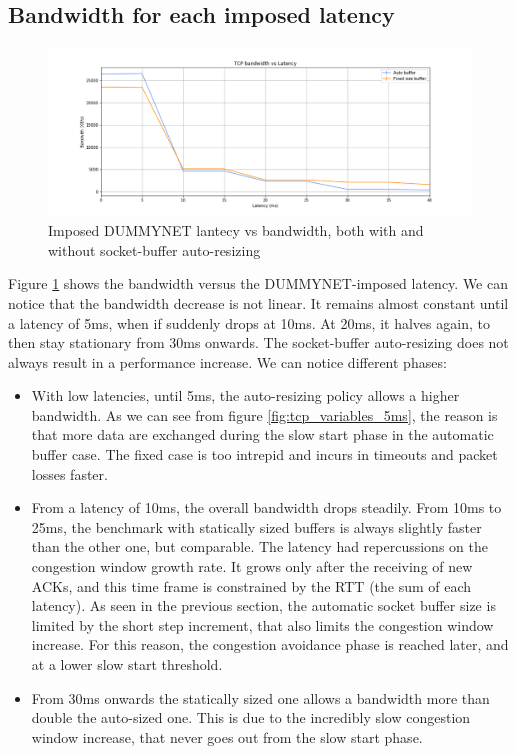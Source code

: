 \documentclass[a4paper,10pt]{article}
\begin{document}
\subsection{Bandwidth for each imposed latency}

\begin{figure}[h]
\centering
\includegraphics[width=\textwidth]{images/tcp_bandwidth.png}
  \caption{Imposed DUMMYNET lantecy vs bandwidth, both with and without socket-buffer auto-resizing}
   \label{fig:bandwidth}
\end{figure}


Figure \ref{fig:bandwidth} shows the bandwidth versus the DUMMYNET-imposed latency. We can notice that the bandwidth decrease is not linear. It remains almost constant until a latency of 5ms, when if suddenly drops at 10ms. At 20ms, it halves again, to then stay stationary from 30ms onwards.
The socket-buffer auto-resizing does not always result in a performance increase. We can notice different phases:
\begin{itemize}
   \item With low latencies, until 5ms, the auto-resizing policy allows a higher bandwidth. As we can see from figure \ref{fig:tcp_variables_5ms}, the reason is that more data are exchanged during the slow start phase in the automatic buffer case. The fixed case is too intrepid and incurs in timeouts and packet losses faster.
   \item From a latency of 10ms, the overall bandwidth drops steadily. From 10ms to 25ms, the benchmark with statically sized buffers is always slightly faster than the other one, but comparable. The latency had repercussions on the congestion window growth rate. It grows only after the receiving of new ACKs, and this time frame is constrained by the RTT (the sum of each latency). As seen in the previous section, the automatic socket buffer size is limited by the short step increment, that also limits the congestion window increase. For this reason, the congestion avoidance phase is reached later, and at a lower slow start threshold.
   \item From 30ms onwards the statically sized one allows a bandwidth more than double the auto-sized one. This is due to the incredibly slow congestion window increase, that never goes out from the slow start phase.
\end{itemize}
\end{document}
